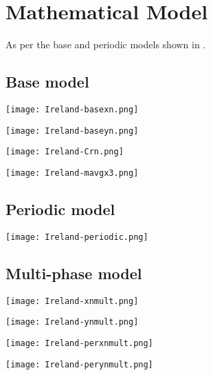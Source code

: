 \section{Mathematical Model}
\label{ch:mathmodel}

As per the base and periodic models shown in \cite{grigor20}.

\subsection{Base model}

\texttt{[image: Ireland-basexn.png]}

\texttt{[image: Ireland-baseyn.png]}

\texttt{[image: Ireland-Crn.png]}

\texttt{[image: Ireland-mavgx3.png]}


\subsection{Periodic model}

\texttt{[image: Ireland-periodic.png]}


\subsection{Multi-phase model}

\texttt{[image: Ireland-xnmult.png]}

\texttt{[image: Ireland-ynmult.png]}

\texttt{[image: Ireland-perxnmult.png]}

\texttt{[image: Ireland-perynmult.png]}

